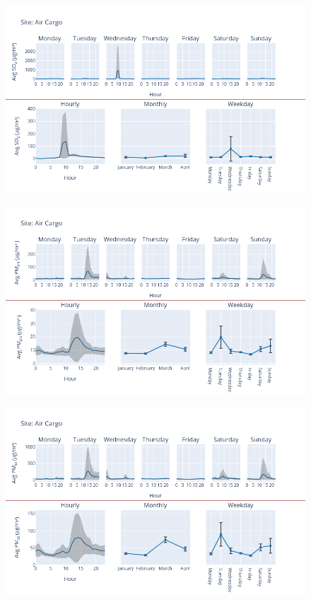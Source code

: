 \documentclass[12pt, oneside]{book}
\begin{document}
{ 
{\begin{figure}[H] 
 \centering 
\includegraphics[width=.88\textwidth, keepaspectratio]{image41} 
 \end{figure}}{} 

{\begin{figure}[H] 
 \centering 
\includegraphics[width=.88\textwidth, keepaspectratio]{image42} 
 \end{figure}}{} 

{\begin{figure}[H] 
 \centering 
\includegraphics[width=.88\textwidth, keepaspectratio]{image43} 
 \end{figure}}{} 

}
\end{document}
